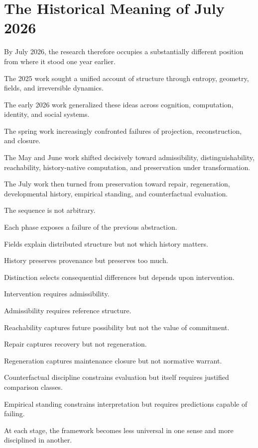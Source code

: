 \documentclass[11pt]{article}
\theoremstyle{remark}
\begin{document}
\section{The Historical Meaning of July 2026}

By July 2026, the research therefore occupies a substantially different position from where it stood one year earlier.

The 2025 work sought a unified account of structure through entropy, geometry, fields, and irreversible dynamics.

The early 2026 work generalized these ideas across cognition, computation, identity, and social systems.

The spring work increasingly confronted failures of projection, reconstruction, and closure.

The May and June work shifted decisively toward admissibility, distinguishability, reachability, history-native computation, and preservation under transformation.

The July work then turned from preservation toward repair, regeneration, developmental history, empirical standing, and counterfactual evaluation.

The sequence is not arbitrary.

Each phase exposes a failure of the previous abstraction.

Fields explain distributed structure but not which history matters.

History preserves provenance but preserves too much.

Distinction selects consequential differences but depends upon intervention.

Intervention requires admissibility.

Admissibility requires reference structure.

Reachability captures future possibility but not the value of commitment.

Repair captures recovery but not regeneration.

Regeneration captures maintenance closure but not normative warrant.

Counterfactual discipline constrains evaluation but itself requires justified comparison classes.

Empirical standing constrains interpretation but requires predictions capable of failing.

At each stage, the framework becomes less universal in one sense and more disciplined in another.
\end{document}
